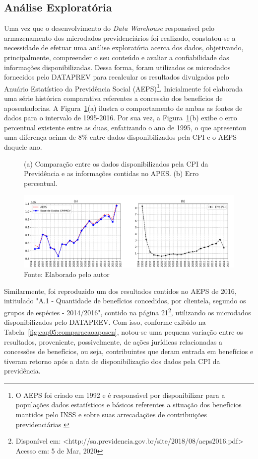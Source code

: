 \subsection{Análise Exploratória}

Uma vez que o desenvolvimento do \textit{Data Warehouse} responsável pelo armazenamento dos microdados previdenciários foi realizado, constatou-se a necessidade de efetuar uma análise exploratória acerca dos dados, objetivando, principalmente, compreender o seu conteúdo e avaliar a confiabilidade das informações disponibilizadas. Dessa forma, foram utilizados os microdados fornecidos pelo DATAPREV para recalcular os resultados divulgados pelo Anuário Estatístico da Previdência Social (AEPS)\footnote{O AEPS foi criado em 1992 e é responsável por disponibilizar para a populações dados estatísticos e básicos referentes a situação dos benefícios mantidos pelo INSS e sobre suas arrecadações de contribuições previdenciárias \cite{cap05_ref14}}. Inicialmente foi elaborada uma série histórica comparativa referentes a concessão dos benefícios de aposentadorias. A Figura~\ref{fig:cap05:aepsvsprev}(a) ilustra o comportamento de ambas as fontes de dados para o intervalo de 1995-2016. Por sua vez, a Figura~\ref{fig:cap05:aepsvsprev}(b) exibe o erro percentual existente entre as duas, enfatizando o ano de 1995, o que apresentou uma diferença acima de 8\% entre dados disponibilizados pela CPI e o AEPS daquele ano.

\begin{figure}[!ht]
    \centering
    \caption{(a) Comparação entre os dados disponibilizados pela CPI da Previdência e as informações contidas no APES. (b) Erro percentual.}
    \includegraphics[width=\textwidth]{figs/cap05_apes_vs_cpiprev.png}
    \caption*{\footnotesize{Fonte: Elaborado pelo autor}}
    \label{fig:cap05:aepsvsprev}
\end{figure}

Similarmente, foi reproduzido um dos resultados contidos no AEPS de 2016, intitulado "A.1 - Quantidade de benefícios concedidos, por clientela, segundo os grupos de espécies - 2014/2016", contido na página 21\footnote{Disponível em: <http://sa.previdencia.gov.br/site/2018/08/aeps2016.pdf> Acesso em: 5 de Mar, 2020}, utilizando os microdados disponibilizados pelo DATAPREV. Com isso, conforme exibido na Tabela~\ref{fig:cap05:comparacaoaposen}, notou-se uma pequena variação entre os resultados, proveniente, possivelmente, de ações jurídicas relacionadas a concessões de benefícios, ou seja, contribuintes que deram entrada em benefícios e tiveram retorno após a data de disponibilização dos dados pela CPI da previdência. 

